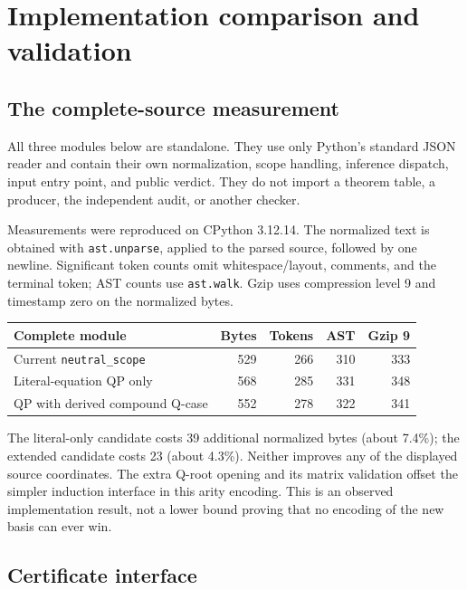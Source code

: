 \documentclass[11pt]{article}
\theoremstyle{definition}
\begin{document}
\section{Implementation comparison and validation}
\label{sec:implementation}

\subsection{The complete-source measurement}

All three modules below are standalone. They use only Python's standard
JSON reader and contain their own normalization, scope handling, inference
dispatch, input entry point, and public verdict. They do not import a theorem
table, a producer, the independent audit, or another checker.

Measurements were reproduced on CPython 3.12.14. The normalized text is obtained with
\texttt{ast.unparse}, applied to the parsed source, followed by one newline. Significant token counts omit whitespace/layout,
comments, and the terminal token; AST counts use \texttt{ast.walk}.
Gzip uses compression level 9 and timestamp zero on the normalized bytes.

\begin{center}
\small
\begin{tabular}{@{}lrrrr@{}}
\toprule
Complete module & Bytes & Tokens & AST & Gzip 9 \\
\midrule
Current \texttt{neutral\_scope} & 529 & 266 & 310 & 333 \\
Literal-equation QP only & 568 & 285 & 331 & 348 \\
QP with derived compound Q-case & 552 & 278 & 322 & 341 \\
\bottomrule
\end{tabular}
\end{center}

The literal-only candidate costs 39 additional normalized bytes (about
7.4\%); the extended candidate costs 23 (about 4.3\%). Neither improves any
of the displayed source coordinates. The extra Q-root opening and its matrix
validation offset the simpler induction interface in this arity encoding.
This is an observed implementation result, not a lower bound proving that
no encoding of the new basis can ever win.

\subsection{Certificate interface}
\end{document}
